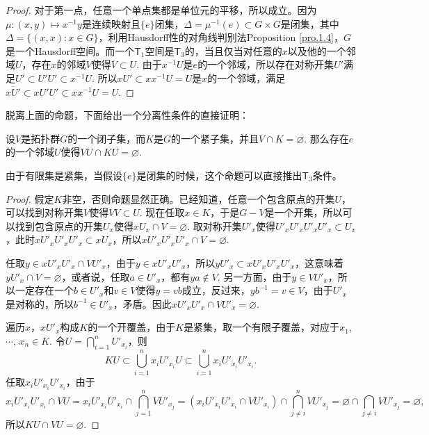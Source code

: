 \begin{proof}
	对于第一点，任意一个单点集都是单位元的平移，所以成立。因为$\mu:(x,y)\mapsto x^{-1}y$是连续映射且$\{e\}$闭集，$\Delta=\mu^{-1}(e)\subset G\times G$是闭集，其中$\Delta=\{(x,x):x\in G\}$，利用Hausdorff性的对角线判别法Proposition \ref{pro.1.4}，$G$是一个Hausdorff空间。而一个$\mathsf{T}_1$空间是$\mathsf{T}_3$的，当且仅当对任意的$x$以及他的一个邻域$U$，存在$x$的邻域$V$使得$\overline{V}\subset U$. 由于$x^{-1}U$是$e$的一个邻域，所以存在对称开集$U'$满足$U'\subset U'U'\subset x^{-1}U$. 所以$xU'\subset xx^{-1}U=U$是$x$的一个邻域，满足$\overline{xU'}\subset xU'U'\subset xx^{-1}U=U$.
\end{proof}

脱离上面的命题，下面给出一个分离性条件的直接证明：

\begin{pro}
设$V$是拓扑群$G$的一个闭子集，而$K$是$G$的一个紧子集，并且$V\cap K=\varnothing$. 那么存在$e$的一个邻域$U$使得$VU\cap KU=\varnothing$.
\end{pro}

由于有限集是紧集，当假设$\{e\}$是闭集的时候，这个命题可以直接推出$\mathsf{T}_3$条件。

\begin{proof}
	假定$K$非空，否则命题显然正确。已经知道，任意一个包含原点的开集$U$，可以找到对称开集$V$使得$VV\subset U$. 现在任取$x\in K$，于是$G-V$是一个开集，所以可以找到包含原点的开集$U_x$使得$xU_x\cap V=\varnothing$. 取对称开集$U'_x$使得$U'_xU'_xU'_xU'_x\subset U_x$，此时$xU'_xU'_xU'_x\subset xU_x$，所以$xU'_xU'_xU'_x\cap V=\varnothing$. 

	任取$y\in xU'_xU'_x\cap VU'_x$，由于$y\in xU'_xU'_x$，所以$yU'_x\subset xU'_xU'_xU'_x$，这意味着$yU'_x\cap V=\varnothing$，或者说，任取$a\in U'_x$，都有$ya\not\in V$. 另一方面，由于$y\in VU'_x$，所以一定存在一个$b\in U'_x$和$v\in V$使得$y=vb$成立，反过来，$yb^{-1}=v\in V$，由于$U'_x$是对称的，所以$b^{-1}\in U'_x$，矛盾。因此$xU'_xU'_x\cap VU'_x=\varnothing$.

	遍历$x$，$xU'_x$构成$K$的一个开覆盖，由于$K$是紧集，取一个有限子覆盖，对应于$x_1$, $\cdots$, $x_n\in K$. 令$U=\bigcap_{i=1}^n U'_{x_i}$，则
	\[
	KU\subset \bigcup_{i=1}^n {x_i}U'_{x_i}U\subset \bigcup_{i=1}^n x_iU'_{x_i}U'_{x_i}.
	\]
	任取$x_iU'_{x_i}U'_{x_i}$，由于
	\[
		x_iU'_{x_i}U'_{x_i}\cap VU=x_iU'_{x_i}U'_{x_i}\cap \bigcap_{j=1}^n VU'_{x_j}=(x_iU'_{x_i}U'_{x_i}\cap VU'_{x_i})\cap \bigcap_{j\neq i}^n VU'_{x_j}=\varnothing \cap \bigcap_{j\neq i} VU'_{x_j}=\varnothing,
	\]
	所以$KU\cap VU=\varnothing$.
\end{proof}

